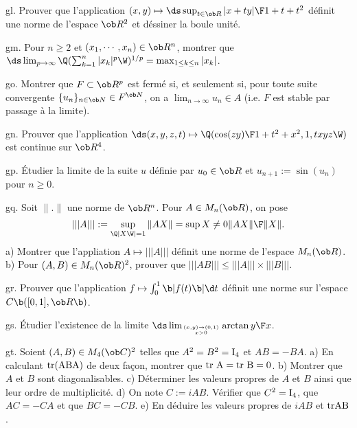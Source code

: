 \exo [Level=2,Fight=1,Learn=1,Type=\Exercices,Field=\Normes,Origin=] gl. 
Prouver que l'application $(x,y)\mapsto\ds\sup_{t\in\ob R}{|x+ty|\F1+t+t^2}$ 
définit une norme de l'espace $\ob R^2$ et déssiner la boule unité. 

\exo [Level=1,Fight=2,Learn=1,Type=\Exercices,Field=\Suites,Origin=] gm. 
Pour $n\ge2$ et $(x_1,\cdots, x_n)\in\ob R^n$, montrer que 
$\ds \lim_{p\to\infty}\Q(\sum_{k=1}^n|x_k|^p\W)^{1/p}=\max_{1\le k\le n}|x_k|$.

\exo [Level=2,Fight=2,Learn=2,Type=\Cours,Field=\Topologie,Origin=] go. Montrer que $F\subset \ob R^p$ est fermé si, 
et seulement si, pour toute suite convergente $\{u_n\}_{n\in\ob N}\in F^{\ob N}$, on a $\lim_{n\to\infty}u_n\in A$ 
(i.e. $F$ est stable par passage à la limite). %

\exo [Level=2,Fight=0,Learn=0,Type=\TravauxDirigés,Field=\Continuité,Origin=] gn. 
Prouver que 
l'application $\ds(x,y,z,t)\mapsto \Q({\cos (zy)\F1+t^2+x^2},1,txyz\W)$ 
est continue sur $\ob R^4$. 

\exo [Level=1,Fight=2,Learn=2,Type=\Exercices,Field=\Suites,Origin=] gp. 
Étudier la limite de la suite $u$ définie par $u_0\in\ob R$ et $u_{n+1}:=\sin(u_n)$ pour $n\ge0$.  

\exo [Level=2,Fight=2,Learn=2,Type=\Cours,Field=\Normes,Origin=\MP] gq. 
Soit $\|.\|$ une norme de $\ob R^n$. Pour $A\in\sc M_n(\ob R)$, 
on pose $$
|||A|||:=\sup_{\Q|X\W|=1}\|AX\|=\sup{X\neq0}{\|AX\|\F \|X\|}.
$$ 
a) Montrer que l'appliation $A\mapsto|||A|||$ définit 
une norme de l'espace $\sc M_n(\ob R)$. \pn
b) Pour $(A,B)\in\sc M_n(\ob R)^2$, prouver que $|||AB|||\le |||A|||\times|||B|||$. %

\exo [Level=2,Fight=1,Learn=1,Type=\Cours,Field=\Normes,Origin=] gr. 
Prouver que l'application $f\mapsto\int_0^1\b|f(t)\b|\d t$ définit une norme sur l'espace $\sc C\b([0,1],\ob R\b)$. 

\exo [Level=2,Fight=0,Learn=0,Type=\Exercices,Field=\Continuité,Origin=] gs. 
Étudier l'existence de la limite $\ds \lim_{(x,y)\to(0,1)\atop x>0}\arctan{y\F x}$. 

\exo [Level=2,Fight=1,Learn=1,Type=\Colles,Field=\Diagonalisation,Origin=] gt. 
Soient $(A,B)\in\sc M_4(\ob C)^2$ telles que $A^2=B^2=\rm I_4$ et $AB=-BA$. \pn
a) En calculant $\rm{tr}(ABA)$ de deux fa\c con, montrer que $\rm{tr}\ A=\rm{tr}\ B=0$. \pn
b) Montrer que $A$ et $B$ sont diagonalisables. \pn
c) Déterminer les valeurs propres de $A$ et $B$ ainsi que leur ordre de multiplicité. \pn
d) On note $C:=iAB$. Vérifier que $C^2=\rm I_4$, que $AC=-CA$ et que $BC=-CB$. \pn
e) En déduire les valeurs propres de $iAB$ et $\rm{tr }AB$. 

